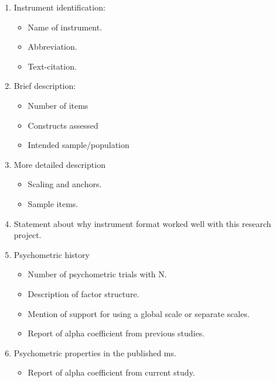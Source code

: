 \documentclass[
  english,
]{book}
\providecommand{\tightlist}{%
  \setlength{\itemsep}{0pt}\setlength{\parskip}{0pt}}
\begin{document}
\begin{enumerate}
\def\labelenumi{\arabic{enumi}.}
\tightlist
\item
  Instrument identification:

  \begin{itemize}
  \tightlist
  \item
    Name of instrument.
  \item
    Abbreviation.
  \item
    Text-citation.
  \end{itemize}
\item
  Brief description:

  \begin{itemize}
  \tightlist
  \item
    Number of items
  \item
    Constructs assessed
  \item
    Intended sample/population
  \end{itemize}
\item
  More detailed description

  \begin{itemize}
  \tightlist
  \item
    Scaling and anchors.
  \item
    Sample items.
  \end{itemize}
\item
  Statement about why instrument format worked well with this research project.
\item
  Psychometric history

  \begin{itemize}
  \tightlist
  \item
    Number of psychometric trials with N.
  \item
    Description of factor structure.
  \item
    Mention of support for using a global scale or separate scales.
  \item
    Report of alpha coefficient from previous studies.
  \end{itemize}
\item
  Psychometric properties in the published ms.

  \begin{itemize}
  \tightlist
  \item
    Report of alpha coefficient from current study.
  \end{itemize}
\end{enumerate}
\end{document}
